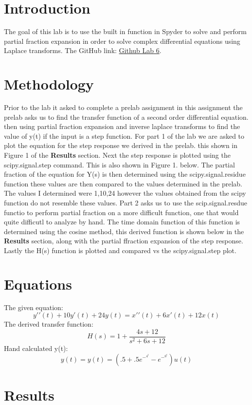\documentclass[12pt]{report}
\begin{document}
\section{Introduction}
 The goal of this lab is to use the built in function in Spyder to solve and perform partial fraction expansion in order to solve complex differential equations using Laplace transforms. \newline \newline The GitHub link: \href{https://github.com/CDJohnson279}{Github Lab 6}. 

\section{Methodology}
Prior to the lab it asked to complete a prelab assignment in this assignment the prelab asks us to find the transfer function of a second order differential equation. then using partial fraction expansion and inverse laplace transforms to find the value of y(t) if the input is a step function. 
For part 1 of the lab we are asked to plot the equation for the step response we derived in the prelab. this shown in Figure 1 of the \textbf{Results} section. Next the step response is plotted using the scipy.signal.step command. This is also shown in Figure 1. below. The partial fraction of the equation for Y(s) is then determined using the scipy.signal.residue function these values are then compared to the values determined in the prelab. The values I determined were 1,10,24 however the values obtained from the scipy function do not resemble these values. 
Part 2 asks us to use the scip.signal.resdue functio to perform partial fraction on a more difficult function, one that would quite difficutl to analyze by hand. The time domain function of this function is determined using the cosine method, this derived function is shown below in the \textbf{Results} section, along with the partial ffraction expansion of the step response. Lastly the H(s) function is plotted and compared vs the scipy.signal.step plot. 

\section{Equations}
The given equation:
$$y
′′(t) + 10y
′
(t) + 24y(t) = x
′′(t) + 6x
′
(t) + 12x(t)$$
The derived transfer function: 
$$H(s) = 1 + \frac{4s+12}{s^2+6s+12}$$
Hand calculated y(t):
$$y(t) = y(t) = (.5+.5e^-^4^t-e^-^6^t)u(t)$$
\section{Results}
\end{document}
